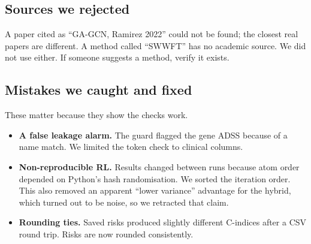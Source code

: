 \documentclass[11pt,a4paper]{article}
\begin{document}
\subsection{Sources we rejected}
\begin{dropbox}
A paper cited as ``GA-GCN, Ramirez 2022'' could not be found; the closest real papers are different. A method called ``SWWFT'' has no academic source. We did not use either. If someone suggests a method, verify it exists.
\end{dropbox}

\subsection{Mistakes we caught and fixed}
These matter because they show the checks work.
\begin{itemize}
  \item \textbf{A false leakage alarm.} The guard flagged the gene ADSS because of a name match. We limited the token check to clinical columns.
  \item \textbf{Non-reproducible RL.} Results changed between runs because atom order depended on Python's hash randomisation. We sorted the iteration order. This also removed an apparent ``lower variance'' advantage for the hybrid, which turned out to be noise, so we retracted that claim.
  \item \textbf{Rounding ties.} Saved risks produced slightly different C-indices after a CSV round trip. Risks are now rounded consistently.
\end{itemize}

\end{document}
